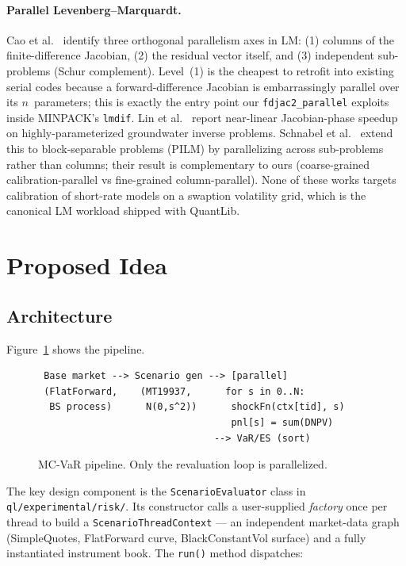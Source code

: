 \documentclass[11pt,twocolumn]{article}
\begin{document}
\paragraph{Parallel Levenberg--Marquardt.}
Cao et al.~\cite{cao2009} identify three orthogonal parallelism axes
in LM: (1) columns of the finite-difference Jacobian, (2) the residual
vector itself, and (3) independent sub-problems (Schur complement).
Level~(1) is the cheapest to retrofit into existing serial codes
because a forward-difference Jacobian is embarrassingly parallel over
its $n$~parameters; this is exactly the entry point our
\texttt{fdjac2\_parallel} exploits inside MINPACK's \texttt{lmdif}.
Lin et al.~\cite{lin2016} report near-linear Jacobian-phase speedup on
highly-parameterized groundwater inverse problems.
Schnabel et al.~\cite{schnabel2025} extend this to block-separable
problems (PILM) by parallelizing across sub-problems rather than
columns; their result is complementary to ours (coarse-grained
calibration-parallel vs fine-grained column-parallel).
None of these works targets calibration of short-rate models on a
swaption volatility grid, which is the canonical LM workload shipped
with QuantLib.

\section{Proposed Idea}
\label{sec:proposed}

\subsection{Architecture}

Figure~\ref{fig:pipeline} shows the pipeline.
\begin{figure}[h]
\centering
\begin{verbatim}
 Base market --> Scenario gen --> [parallel]
 (FlatForward,    (MT19937,      for s in 0..N:
  BS process)      N(0,s^2))      shockFn(ctx[tid], s)
                                  pnl[s] = sum(DNPV)
                               --> VaR/ES (sort)
\end{verbatim}
\caption{MC-VaR pipeline.  Only the revaluation loop is parallelized.}
\label{fig:pipeline}
\end{figure}

The key design component is the \texttt{ScenarioEvaluator} class
in \texttt{ql/experimental/risk/}.
Its constructor calls a user-supplied \emph{factory} once per
thread to build a \texttt{ScenarioThreadContext} --- an independent
market-data graph (SimpleQuotes, FlatForward curve, BlackConstantVol
surface) and a fully instantiated instrument book.
The \texttt{run()} method dispatches:
\end{document}

